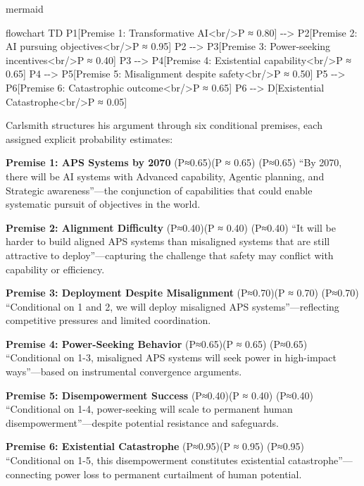 \documentclass[
  11pt,
  letterpaper,
]{book}
\newenvironment{Shaded}{\begin{snugshade}}{\end{snugshade}}
\newcommand{\NormalTok}[1]{\textcolor[rgb]{0.00,0.23,0.31}{#1}}
\begin{document}
mermaid

\begin{Shaded}
\begin{Highlighting}[]
\NormalTok{flowchart TD}
\NormalTok{    P1[Premise 1: Transformative AI\textless{}br/\textgreater{}P ≈ 0.80] {-}{-}\textgreater{} P2[Premise 2: AI pursuing objectives\textless{}br/\textgreater{}P ≈ 0.95]}
\NormalTok{    P2 {-}{-}\textgreater{} P3[Premise 3: Power{-}seeking incentives\textless{}br/\textgreater{}P ≈ 0.40]}
\NormalTok{    P3 {-}{-}\textgreater{} P4[Premise 4: Existential capability\textless{}br/\textgreater{}P ≈ 0.65]}
\NormalTok{    P4 {-}{-}\textgreater{} P5[Premise 5: Misalignment despite safety\textless{}br/\textgreater{}P ≈ 0.50]}
\NormalTok{    P5 {-}{-}\textgreater{} P6[Premise 6: Catastrophic outcome\textless{}br/\textgreater{}P ≈ 0.65]}
\NormalTok{    P6 {-}{-}\textgreater{} D[Existential Catastrophe\textless{}br/\textgreater{}P ≈ 0.05]}
\end{Highlighting}
\end{Shaded}

Carlsmith structures his argument through six conditional premises, each
assigned explicit probability estimates:

\textbf{Premise 1: APS Systems by 2070} (P≈0.65)(P ≈ 0.65) (P≈0.65) ``By
2070, there will be AI systems with Advanced capability, Agentic
planning, and Strategic awareness''---the conjunction of capabilities
that could enable systematic pursuit of objectives in the world.

\textbf{Premise 2: Alignment Difficulty} (P≈0.40)(P ≈ 0.40) (P≈0.40)
``It will be harder to build aligned APS systems than misaligned systems
that are still attractive to deploy''---capturing the challenge that
safety may conflict with capability or efficiency.

\textbf{Premise 3: Deployment Despite Misalignment} (P≈0.70)(P ≈ 0.70)
(P≈0.70) ``Conditional on 1 and 2, we will deploy misaligned APS
systems''---reflecting competitive pressures and limited coordination.

\textbf{Premise 4: Power-Seeking Behavior} (P≈0.65)(P ≈ 0.65) (P≈0.65)
``Conditional on 1-3, misaligned APS systems will seek power in
high-impact ways''---based on instrumental convergence arguments.

\textbf{Premise 5: Disempowerment Success} (P≈0.40)(P ≈ 0.40) (P≈0.40)
``Conditional on 1-4, power-seeking will scale to permanent human
disempowerment''---despite potential resistance and safeguards.

\textbf{Premise 6: Existential Catastrophe} (P≈0.95)(P ≈ 0.95) (P≈0.95)
``Conditional on 1-5, this disempowerment constitutes existential
catastrophe''---connecting power loss to permanent curtailment of human
potential.
\end{document}
